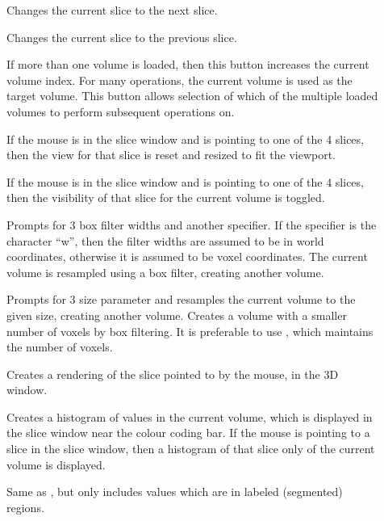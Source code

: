 \begin{description}
\item[]  Changes the current slice to the next slice.
\item[]  Changes the current slice to the previous slice.
\item[]  If more than one volume is loaded, then
       this button increases the current volume index.  For many operations,
       the current volume is used as the target volume.  This button allows
       selection of which of the multiple loaded volumes to perform
       subsequent operations on.
\item[]  If the mouse is in the slice
   window and is pointing to one of the 4 slices, then the view for
   that slice is reset and resized to fit the viewport.
\item[]  If the mouse is in the slice
   window and is pointing to one of the 4 slices, then the visibility
   of that slice for the current volume is toggled.
\item[]  Prompts for 3 box filter
       widths and another specifier.  If the specifier is the
       character ``w'', then the
       filter widths are assumed to be in world coordinates, otherwise
       it is assumed to be voxel coordinates.  The current volume is resampled
       using a box filter, creating another volume.
\item[]  Prompts for 3 size parameter and
       resamples the current volume to the given size, creating another
       volume.  Creates a volume with a smaller number of voxels by box
       filtering.  It is preferable to use ,
       which maintains the number of voxels.
\item[]  Creates a rendering of the slice
       pointed to by the mouse, in the 3D window.
\item[]  Creates a histogram of
       values in the current volume, which is displayed in the slice window
       near the colour coding bar.
       If the mouse is pointing to a slice in the slice window, then a
       histogram of that slice only of the current volume is displayed.
\item[]  Same as
       , but only includes values
       which are in labeled (segmented) regions.

\end{description}

